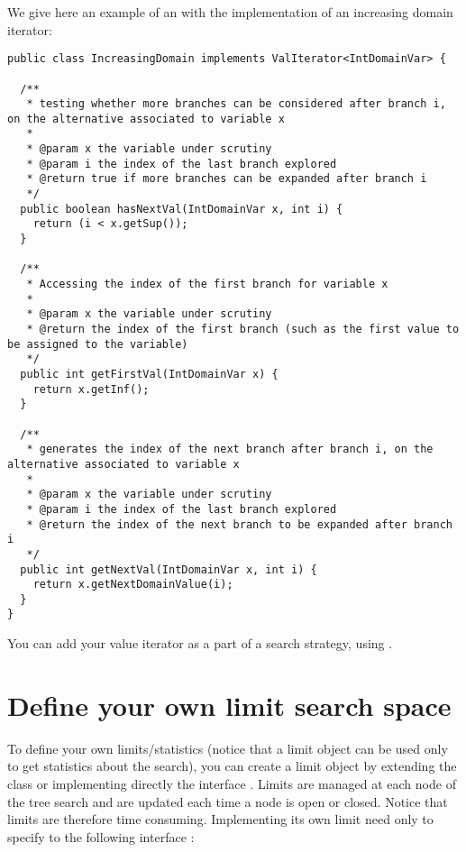We give here an example of an  with the implementation of an increasing domain iterator:
\begin{lstlisting}
public class IncreasingDomain implements ValIterator<IntDomainVar> {

  /**
   * testing whether more branches can be considered after branch i, on the alternative associated to variable x
   *
   * @param x the variable under scrutiny
   * @param i the index of the last branch explored
   * @return true if more branches can be expanded after branch i
   */
  public boolean hasNextVal(IntDomainVar x, int i) {
    return (i < x.getSup());
  }

  /**
   * Accessing the index of the first branch for variable x
   *
   * @param x the variable under scrutiny
   * @return the index of the first branch (such as the first value to be assigned to the variable)
   */
  public int getFirstVal(IntDomainVar x) {
    return x.getInf();
  }

  /**
   * generates the index of the next branch after branch i, on the alternative associated to variable x
   *
   * @param x the variable under scrutiny
   * @param i the index of the last branch explored
   * @return the index of the next branch to be expanded after branch i
   */
  public int getNextVal(IntDomainVar x, int i) {
    return x.getNextDomainValue(i);
  }
}
\end{lstlisting}

You can add your value iterator as a part of a search strategy, using .


\section{Define your own limit search space}\label{advanced:defineyourownlimitsearchspace}\hypertarget{advanced:defineyourownlimitsearchspace}{}

To define your own limits/statistics (notice that a limit object can be used only to get statistics about the search), you can create a limit object by extending the  class or implementing directly the interface . Limits are managed at each node of the tree search and are updated each time a node is open or closed. Notice that limits are therefore time consuming. Implementing its own limit need only to specify to the following interface :

